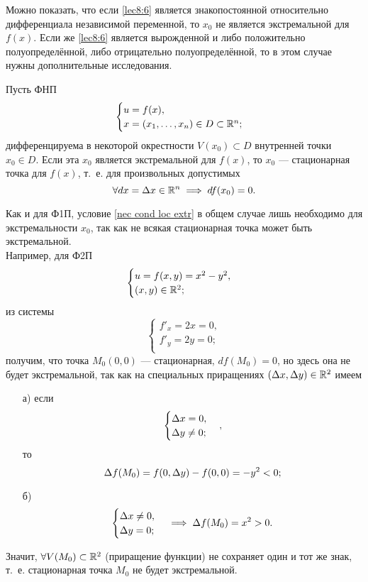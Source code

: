 \documentclass[../main.tex]{subfiles}
\begin{document}
\begin{rem}
        Можно показать, что если \eqref{lec8:6} является знакопостоянной
        относительно дифференциала независимой переменной, то $x_0$ не
        является экстремальной для $f(x)$. Если же \eqref{lec8:6} является
        вырожденной и либо положительно полуопределённой, либо отрицательно
        полуопределённой, то в этом случае нужны дополнительные исследования.
    \end{rem}
\begin{thm}
		Пусть ФНП
		\[
		\begin{cases}
			u = f (x), \\
			x = (x_1, \ldots, x_n) \in D \subset \mathbb{R}^n; \\
		\end{cases}
		\]
		дифференцируема в некоторой окрестности $V (x_0) \subset D$
		внутренней точки $x_0 \in D$. Если эта $x_0$ является экстремальной
		для $f (x)$, то $x_0$ --- стационарная точка
		для $f (x)$, т.~е. для произвольных допустимых
		\begin{equation}
		\label{nec cond loc extr}
			\forall dx = \Delta x \in \mathbb{R}^n \implies df (x_0) = 0.
		\end{equation}
	\end{thm}
\begin{rem}
		Как и для Ф1П, условие \eqref{nec cond loc extr} в общем случае
		лишь необходимо для экстремальности $x_0$, так как не всякая
		стационарная точка может быть экстремальной. \\
		Например, для Ф2П
		\[
		\begin{cases}
			u = f (x, y) = x^2 - y^2, \\
			(x, y) \in \mathbb{R}^2; \\
		\end{cases}
		\]
		из системы
		\[
		\begin{cases}
			f'_x = 2x = 0, \\
			f'_y = 2y = 0; \\
		\end{cases}
		\]
		получим, что точка $M_0 (0, 0)$ --- стационарная,
		$df (M_0) = 0$,
		но здесь она не будет экстремальной, так как на специальных приращениях
		$(\Delta x, \Delta y) \in \mathbb{R}^2$ имеем
		\begin{enumerate}
			\item[а)]
			если
			\[
			\begin{cases}
				\Delta x = 0, \\
				\Delta y \ne 0; \\
			\end{cases},
			\]
			то
			\[
				\Delta f (M_0)
				= f (0, \Delta y) - f (0, 0)
				= -y^2 < 0;
			\]
			
			\item[б)]
			\[
			\begin{cases}
				\Delta x \ne 0, \\
				\Delta y = 0; \\
			\end{cases}
			\implies
			\Delta f (M_0)
			= x^2 > 0.
			\]
		\end{enumerate}
		Значит, $\forall V (M_0) \subset \mathbb{R}^2$ (приращение функции)
		не сохраняет один и тот же знак, т.~е. стационарная точка $M_0$
		не будет экстремальной.
	\end{rem}
\end{document}
